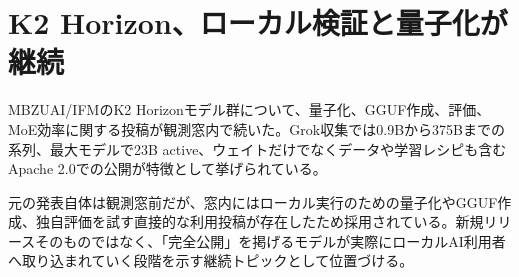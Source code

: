 \section{K2 Horizon、ローカル検証と量子化が継続}

MBZUAI/IFMのK2 Horizonモデル群について、量子化、GGUF作成、評価、MoE効率に関する投稿が観測窓内で続いた。Grok収集では0.9Bから375Bまでの系列、最大モデルで23B active、ウェイトだけでなくデータや学習レシピも含むApache 2.0での公開が特徴として挙げられている。

元の発表自体は観測窓前だが、窓内にはローカル実行のための量子化やGGUF作成、独自評価を試す直接的な利用投稿が存在したため採用されている。新規リリースそのものではなく、「完全公開」を掲げるモデルが実際にローカルAI利用者へ取り込まれていく段階を示す継続トピックとして位置づける。

